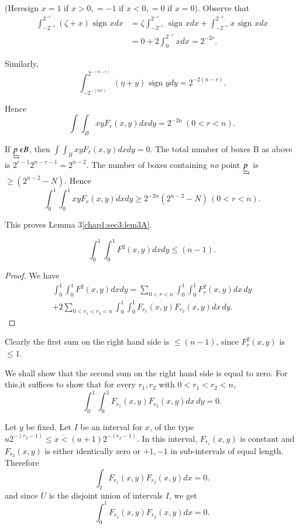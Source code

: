 (Here\pageoriginale sign $x = 1$  if $x > 0, = -1$ if $x < 0, = 0$  if $x = 0$). Observe that
\begin{align*}
\int_{-2^{-r}}^{2^{-r}} (\zeta+x)\text{ sign }x dx & = \zeta \int_{-2^{-r}}^{2^{-r}} \text{ sign }x dx + \int_{-2^{-r}}^{2^{-r}} x \text{ sign }x dx\\ 
& = 0+2 \int_{0}^{2^{-r}} x dx = 2^{-2r}.
\end{align*}

Similarly,
$$
\int_{-2^{-(nir)}}^{2^{-(n-r)}} (\eta+y)\text{ sign }y dy = 2^{-2(n-r)}.
$$

Hence 
$$
\int\int_{B} xy F_{r} (x, y)dx dy = 2^{-2n}~ (0<r<n).
$$

If $\underline{\underline{p}}_{i} \epsilon B$, then $\int\int_{B} xy F_{r} (x, y) dx dy = 0$. The total number of boxes B as above is $2^{r-1} 2^{n-r-1} = 2^{n-2}$. The number of boxes containing {\em no} point $\underline{\underline{p}}_{i}$ is $\geq (2^{n-2} - N)$. Hence
$$
\int_{0}^{1}\int_{0}^{1} xy F_{r} (x, y)dx dy \geq 2^{-2n}(2^{n-2} -N)\,  (0<r<n).
$$

This proves Lemma 3\ref{chap1:sec3:lem3A}.

\begin{lemma}\label{chap1:sec3:lem3B}
$$
\int_{0}^{1}\int_{0}^{1} F^{2} (x, y)dx dy \leq (n-1).
$$
\end{lemma}

\begin{proof}
 We have
\begin{multline*}
\int_{0}^{1}\int_{0}^{1} F^{2} (x, y)dx dy = \sum_{0<r<n} \int_{0}^{1}\int_{0}^{1} F_{r}^{2} (x, y)dx \, dy\\
+ 2\sum_{0<r_{1}<r_{2}<n} \int_{0}^{1} \int_{0}^{1} F_{r_{1}} (x, y) F_{r_{2}} (x, y)dx\,dy. 
\end{multline*}
\end{proof}

Clearly the first sum on the right hand side is $\leq (n-1)$, since $F_{r}^{2}(x, y)$ is $\leq 1$.

We shall show that the second sum on the right hand side is equal to zero. For this,\pageoriginale it suffices to show that for every $r_{1}, r_{2}$ with $0<r_{1}<r_{2}<n$,
$$
\int_{0}^{1} \int_{0}^{1} F_{r_{1}} (x, y)F_{r_{2}} (x, y)dx \, dy = 0.
$$

Let $y$ be fixed. Let $I$ be an interval for $x$, of the type $u2^{-(r_{2} - 1)} \leq x \dot{<} (u+1)2^{-(r_{2}-1)}$. In this interval, $F_{r_{1}} (x, y)$ is constant and $F_{r_{2}} (x, y)$ is either identically zero or $+1, -1$ in sub-intervals of equal length. Therefore
$$
\int_{I} F_{r_{1}} (x, y) F_{r_{2}}(x, y) dx = 0.
$$
and since $U$ is the disjoint union of intervals $I$, we get
$$
\int_{0}^{1} F_{r_{1}} (x, y) F_{r_{2}} (x, y) dx = 0.
$$


